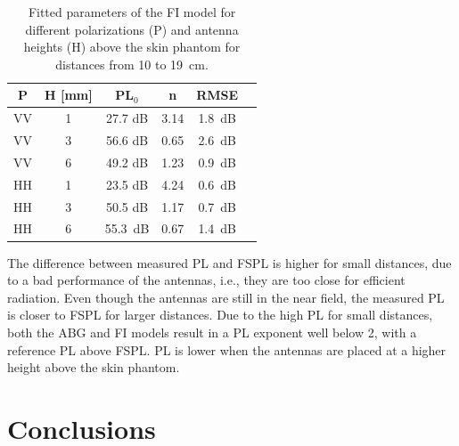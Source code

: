 \documentclass[preprint]{rsl}
\begin{document}
\begin{table}[tb]
  \caption{Fitted parameters of the FI model for different polarizations (P) and antenna heights (H) above the skin phantom for distances from 10 to 19~cm.}
  \label{table:FI}
  \begin{center}
    \begin{tabular}{cc|cccc}
      P & H [mm] & PL$_0$ & n& RMSE \\
      \hline
      VV & 1 & 27.7 dB & 3.14 & 1.8~dB \\
      VV & 3 & 56.6 dB & 0.65 & 2.6~dB \\
      VV & 6 & 49.2 dB & 1.23 & 0.9~dB \\
      HH & 1 & 23.5 dB & 4.24 & 0.6~dB \\
      HH & 3 & 50.5 dB & 1.17 & 0.7~dB \\
      HH & 6 & 55.3~dB & 0.67 & 1.4~dB \\
    \end{tabular}
  \end{center}
\end{table}

The difference between measured PL and FSPL is higher for small distances, due to a bad performance of the antennas, i.e., they are too close for efficient radiation. 
Even though the antennas are still in the near field, the measured PL is closer to FSPL for larger distances. 
Due to the high PL for small distances, both the ABG and FI models result in a PL exponent well below 2, with a reference PL above FSPL. 
PL is lower when the antennas are placed at a higher height above the skin phantom. 

\section{Conclusions\label{sect:conclusion}}
\end{document}
